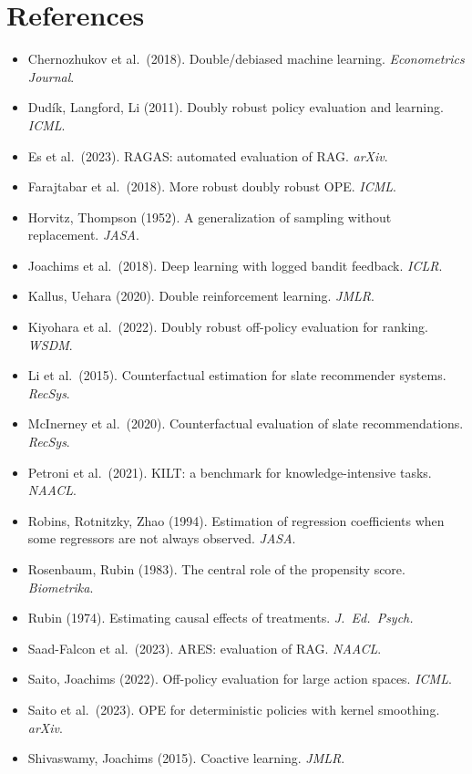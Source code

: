 \documentclass[11pt]{article}
\begin{document}
\section*{References}
\small
\begin{itemize}\itemsep=1pt
\item Chernozhukov et al.\ (2018).  Double/debiased machine learning.  \emph{Econometrics Journal}.
\item Dud\'ik, Langford, Li (2011).  Doubly robust policy evaluation and learning.  \emph{ICML}.
\item Es et al.\ (2023).  RAGAS: automated evaluation of RAG.  \emph{arXiv}.
\item Farajtabar et al.\ (2018).  More robust doubly robust OPE.  \emph{ICML}.
\item Horvitz, Thompson (1952).  A generalization of sampling without replacement.  \emph{JASA}.
\item Joachims et al.\ (2018).  Deep learning with logged bandit feedback.  \emph{ICLR}.
\item Kallus, Uehara (2020).  Double reinforcement learning.  \emph{JMLR}.
\item Kiyohara et al.\ (2022).  Doubly robust off-policy evaluation for ranking.  \emph{WSDM}.
\item Li et al.\ (2015).  Counterfactual estimation for slate recommender systems.  \emph{RecSys}.
\item McInerney et al.\ (2020).  Counterfactual evaluation of slate recommendations.  \emph{RecSys}.
\item Petroni et al.\ (2021).  KILT: a benchmark for knowledge-intensive tasks.  \emph{NAACL}.
\item Robins, Rotnitzky, Zhao (1994).  Estimation of regression coefficients when some regressors are not always observed.  \emph{JASA}.
\item Rosenbaum, Rubin (1983).  The central role of the propensity score.  \emph{Biometrika}.
\item Rubin (1974).  Estimating causal effects of treatments.  \emph{J.\ Ed.\ Psych.}
\item Saad-Falcon et al.\ (2023).  ARES: evaluation of RAG.  \emph{NAACL}.
\item Saito, Joachims (2022).  Off-policy evaluation for large action spaces.  \emph{ICML}.
\item Saito et al.\ (2023).  OPE for deterministic policies with kernel smoothing.  \emph{arXiv}.
\item Shivaswamy, Joachims (2015).  Coactive learning.  \emph{JMLR}.

\end{itemize}
\end{document}

